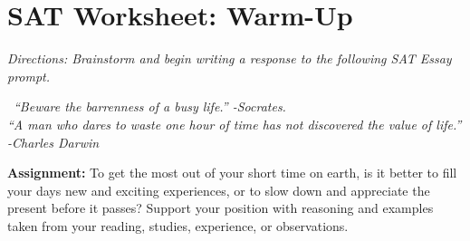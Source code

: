 \section{SAT Worksheet: Warm-Up}

\textit{Directions: Brainstorm and begin writing a response to the following SAT Essay prompt.}

\ \textit{``Beware the barrenness of a busy life.'' -Socrates. \\ ``A man who dares to waste one hour of time has not discovered the value of life.'' -Charles Darwin}

\large{\bf{Assignment:}} To get the most out of your short time on earth, is it better to fill your days new and exciting experiences, or to slow down and appreciate the present before it passes? Support your position with reasoning and examples taken from your reading, studies, experience, or observations.
